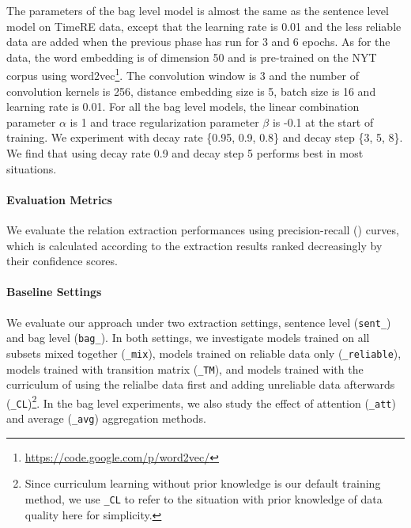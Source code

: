 The parameters of the bag level model is almost the same as the sentence level model on TimeRE data, except that the learning rate is 0.01 and the less reliable data are added when the previous phase has run for 3 and 6 epochs. As for the \EntityRE data, the word embedding is of dimension 50 and is pre-trained on the NYT corpus using word2vec\footnote{\url{ https://code.google.com/p/word2vec/}}. The convolution window is 3 and the number of convolution kernels is 256, distance embedding size is 5, batch size is 16 and learning rate is 0.01. For all the bag level models, the linear combination parameter $\alpha$ is 1 and trace regularization parameter $\beta$ is -0.1 at the start of training. We experiment with decay rate \{0.95, 0.9, 0.8\} and decay step \{3, 5, 8\}. We find that using decay rate 0.9 and decay step 5 performs best in most situations.

\paragraph{Evaluation Metrics}
We evaluate the relation extraction performances using precision-recall (\PR) curves, which is calculated according to the extraction results ranked decreasingly by their confidence scores.

\paragraph{Baseline Settings}
We evaluate our approach under two extraction settings, sentence level
(\texttt{sent\_}) and bag level (\texttt{bag\_}). In both settings, we
investigate models trained on all subsets mixed together (\texttt{\_mix}),
models trained on reliable data only (\texttt{\_reliable}), models trained
with transition matrix (\texttt{\_TM}), and models trained
with the curriculum of using the relialbe data first and adding unreliable data afterwards (\texttt{\_CL})\footnote{Since curriculum learning without prior knowledge is our default training method, we use \texttt{\_CL} to refer to the situation with prior knowledge of data quality here for simplicity.}. 
In the bag level experiments, we also study the effect of attention (\texttt{\_att}) and average
(\texttt{\_avg}) aggregation methods.

